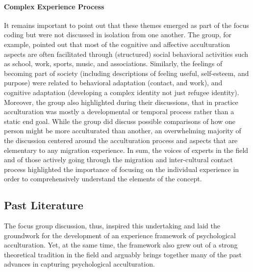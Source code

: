 \documentclass[nobib]{tufte-handout}
\begin{document}
\paragraph{Complex Experience Process} It remains important to point out that these themes emerged as part of the focus coding but were not discussed in isolation from one another. The group, for example, pointed out that most of the cognitive and affective acculturation aspects are often facilitated through (structured) social behavioral activities such as school, work, sports, music, and associations. Similarly, the feelings of becoming part of society (including descriptions of feeling useful, self-esteem, and purpose) were related to behavioral adaptation (contact, and work), and cognitive adaptation (developing a complex identity not just refugee identity). Moreover, the group also highlighted during their discussions, that in practice acculturation was mostly a developmental or temporal process rather than a static end goal. While the group did discuss possible comparisons of how one person might be more acculturated than another, an overwhelming majority of the discussion centered around the acculturation process and aspects that are elementary to any migration experience. In sum, the voices of experts in the field and of those actively going through the migration and inter-cultural contact process highlighted the importance of focusing on the individual experience in order to comprehensively understand the elements of the concept.

\subsection{Past Literature}
The focus group discussion, thus, inspired this undertaking and laid the groundwork for the development of an experience framework of psychological acculturation. Yet, at the same time, the framework also grew out of a strong theoretical tradition in the field and arguably brings together many of the past advances in capturing psychological acculturation.
\end{document}
